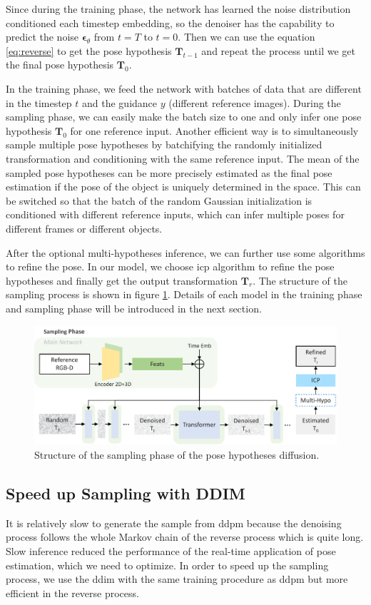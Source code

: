 \documentclass[12pt,DIV14,BCOR12mm,a4paper,footinclude=false,headinclude,parskip=half-,twoside,openright,cleardoublepage=empty,toc=index,bibliography=totoc,listof=totoc]{scrreprt}
\numberwithin{equation}{chapter}
\begin{document}
Since during the training phase, the network has learned the noise distribution conditioned each timestep embedding, so the denoiser has the capability to predict the noise $\boldsymbol{\epsilon}_{\theta}$ from $t=T$ to $t=0$. Then we can use the equation \ref{eq:reverse} to get the pose hypothesis $\mathbf{T}_{t-1}$ and repeat the process until we get the final pose hypothesis $\mathbf{T}_{0}$. 

In the training phase, we feed the network with batches of data that are different in the timestep $t$ and the guidance $y$ (different reference images). During the sampling phase, we can easily make the batch size to one and only infer one pose hypothesis $\mathbf{T}_{0}$ for one reference input. Another efficient way is to simultaneously sample multiple pose hypotheses by batchifying the randomly initialized transformation and conditioning with the same reference input. The mean of the sampled pose hypotheses can be more precisely estimated as the final pose estimation if the pose of the object is uniquely determined in the space. This can be switched so that the batch of the random Gaussian initialization is conditioned with different reference inputs, which can infer multiple poses for different frames or different objects.

After the optional multi-hypotheses inference, we can further use some algorithms to refine the pose. In our model, we choose \gls{icp}\cite{121791} algorithm to refine the pose hypotheses and finally get the output transformation $\mathbf{T}_{r}$. The structure of the sampling process is shown in figure \ref{img:sample}. Details of each model in the training phase and sampling phase will be introduced in the next section.
\begin{figure}[h]
	\centering
	\includegraphics[width=1.0\textwidth]{img/sample.pdf}
	\caption{Structure of the sampling phase of the pose hypotheses diffusion.}
	\label{img:sample}
\end{figure}

\subsection{Speed up Sampling with DDIM}
It is relatively slow to generate the sample from \gls{ddpm} because the denoising process follows the whole Markov chain of the reverse process which is quite long. Slow inference reduced the performance of the real-time application of pose estimation, which we need to optimize. In order to speed up the sampling process, we use the \gls{ddim} \cite{song2022denoising} with the same training procedure as \gls{ddpm} but more efficient in the reverse process.
\end{document}
